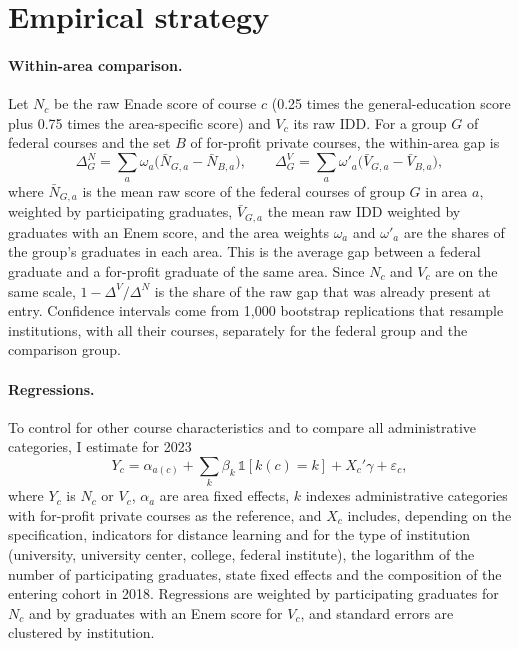 \documentclass[11pt,a4paper]{article}
\begin{document}
\section{Empirical strategy}\label{sec:method}

\paragraph{Within-area comparison.} Let $N_c$ be the raw Enade score of course $c$ (0.25 times the general-education score plus 0.75 times the area-specific score) and $V_c$ its raw IDD. For a group $G$ of federal courses and the set $B$ of for-profit private courses, the within-area gap is
\begin{equation}\label{eq:matched}
\Delta^N_G=\sum_{a} \omega_{a}\Big(\bar N_{G,a}-\bar N_{B,a}\Big), \qquad
\Delta^V_G=\sum_{a} \omega'_{a}\Big(\bar V_{G,a}-\bar V_{B,a}\Big),
\end{equation}
where $\bar N_{G,a}$ is the mean raw score of the federal courses of group $G$ in area $a$, weighted by participating graduates, $\bar V_{G,a}$ the mean raw IDD weighted by graduates with an Enem score, and the area weights $\omega_a$ and $\omega'_a$ are the shares of the group's graduates in each area. This is the average gap between a federal graduate and a for-profit graduate of the same area. Since $N_c$ and $V_c$ are on the same scale, $1-\Delta^V/\Delta^N$ is the share of the raw gap that was already present at entry. Confidence intervals come from 1,000 bootstrap replications that resample institutions, with all their courses, separately for the federal group and the comparison group.

\paragraph{Regressions.} To control for other course characteristics and to compare all administrative categories, I estimate for 2023
\begin{equation}\label{eq:reg}
Y_c=\alpha_{a(c)}+\sum_{k}\beta_k\,\mathbb{1}[k(c)=k]+X_c'\gamma+\varepsilon_c,
\end{equation}
where $Y_c$ is $N_c$ or $V_c$, $\alpha_a$ are area fixed effects, $k$ indexes administrative categories with for-profit private courses as the reference, and $X_c$ includes, depending on the specification, indicators for distance learning and for the type of institution (university, university center, college, federal institute), the logarithm of the number of participating graduates, state fixed effects and the composition of the entering cohort in 2018. Regressions are weighted by participating graduates for $N_c$ and by graduates with an Enem score for $V_c$, and standard errors are clustered by institution.
\end{document}
